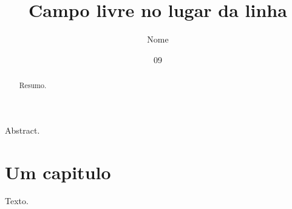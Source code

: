 \documentclass[dsc]{ufrj}
\title{Campo livre no lugar da linha}
\author{Nome}{Sobrenome}
\date{09}{2026}
\begin{document}
  \maketitle
  \frontmatter
  \begin{abstract}Resumo.\end{abstract}
  \begin{foreignabstract}Abstract.\end{foreignabstract}
  \tableofcontents
  \mainmatter
  \chapter{Um capitulo}
  Texto.
\end{document}

